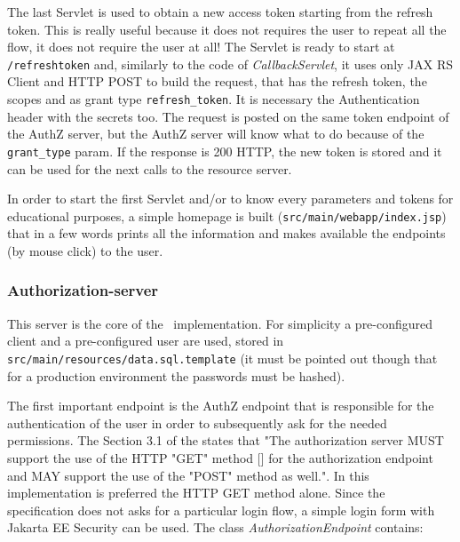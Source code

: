 The last Servlet is used to obtain a new access token starting from the refresh token. This is really useful because it does not requires the user to repeat all the flow, it does not require the user at all! The Servlet is ready to start at \texttt{/refreshtoken} and, similarly to the code of \textit{CallbackServlet}, it uses only JAX RS Client and HTTP POST to build the request, that has the refresh token, the scopes and as grant type \texttt{refresh\_token}. It is necessary the Authentication header with the secrets too. The request is posted on the same token endpoint of the AuthZ server, but the AuthZ server will know what to do because of the \texttt{grant\_type} param. If the response is 200 HTTP, the new token is stored and it can be used for the next calls to the resource server.

In order to start the first Servlet and/or to know every parameters and tokens for educational purposes, a simple homepage is built (\texttt{src/main/webapp/index.jsp}) that in a few words prints all the information and makes available the endpoints (by mouse click) to the user.

\subsubsection{Authorization-server}
This server is the core of the \oauth\ implementation. For simplicity a pre-configured client and a pre-configured user are used, stored in \texttt{src/main/resources/data.sql.template} (it must be pointed out though that for a production environment the passwords must be hashed). 

The first important endpoint is the AuthZ endpoint that is responsible for the authentication of the user in order to subsequently ask for the needed permissions. The Section 3.1 of the  states that "The authorization server MUST support the use of the HTTP "GET" method [] for the authorization endpoint and MAY support the use of the "POST" method as well.". In this implementation is preferred the HTTP GET method alone. Since the specification does not asks for a particular login flow, a simple login form with Jakarta EE Security can be used. The class \textit{AuthorizationEndpoint} contains:

